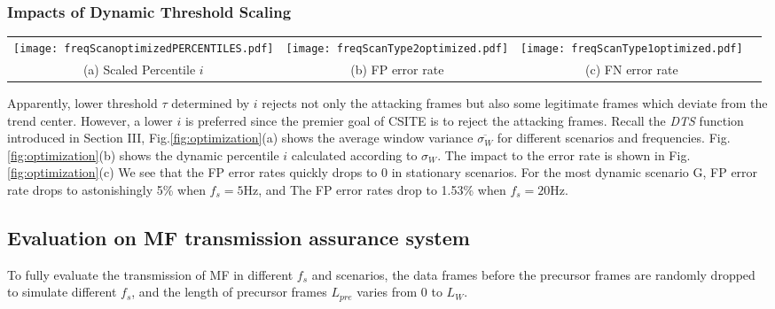 \documentclass[conference]{IEEEtran}
\begin{document}
\subsubsection{Impacts of Dynamic Threshold Scaling}


\begin{figure*}[!ht]
\begin{center}
\begin{tabular}{cccc}
\hspace{-0.2in}
\texttt{[image: freqScanoptimizedPERCENTILES.pdf]}  & \hspace{-0.25in}
\texttt{[image: freqScanType2optimized.pdf]}  & \hspace{-0.25in}
\texttt{[image: freqScanType1optimized.pdf]}  \\
(a) Scaled Percentile $i$ &(b) FP error rate &(c) FN error rate
\end{tabular}
\end{center}
\caption{(a) shows the calculated percentile $i$ according to $\sigma_W$. (b) and (c) present the corresponding FP and FN error rates using the percentile $i$ shown in (a).}

\label{fig:optimization}
\end{figure*}

Apparently, lower threshold $\tau$ determined by $i$ rejects not only the attacking frames but also some legitimate frames which deviate from the trend center. However, a lower $i$ is preferred since the premier goal of CSITE is to reject the attacking frames. Recall the \textit{DTS} function introduced in Section III, Fig.\ref{fig:optimization}(a) shows the average window variance $\overline{\sigma_W}$ for different scenarios and frequencies. Fig.\ref{fig:optimization}(b) shows the dynamic percentile $i$ calculated according to $\sigma_W$. The impact to the error rate is shown in Fig.\ref{fig:optimization}(c) We see that the FP error rates quickly drops to $0$ in stationary scenarios. For the most dynamic scenario G, FP error rate drops to astonishingly 5\% when $f_s=5$Hz, and The FP error rates drop to 1.53\% when $f_s=20$Hz.



\subsection{Evaluation on MF transmission assurance system}
To fully evaluate the transmission of MF in different $f_s$ and scenarios, the data frames before the precursor frames are randomly dropped to simulate different $f_s$, and the length of precursor frames $L_{pre}$ varies from $0$ to $L_W$.
\end{document}
